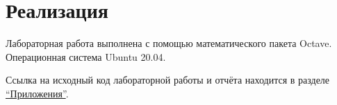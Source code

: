 \section{Реализация}

Лабораторная работа выполнена с помощью математического пакета Octave. Операционная система Ubuntu 20.04.

Ссылка на исходный код лабораторной работы и отчёта находится в разделе \hyperref[app]{``Приложения''}.